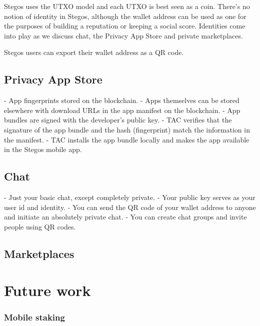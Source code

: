 \documentclass[a4paper, 10pt, conference]{ieeeconf}
\begin{document}
Stegos uses the UTXO model and each UTXO is best seen as a coin. There's no notion of identity in Stegos, although the wallet address can be used as one for the purposes of building a reputation or keeping a social score. Identities come into play as we discuss chat, the Privacy App Store and private marketplaces. 
 
Stegos users can export their wallet address as a QR code. 
 
\subsection{Privacy App Store}
 
- App fingerprints stored on the blockchain. 
- Apps themselves can be stored elsewhere with download URLs in the app manifest on the blockchain.
- App bundles are signed with the developer's public key.
- TAC verifies that the signature of the app bundle and the hash (fingerprint) match the information in the manifest.
- TAC installs the app bundle locally and makes the app available in the Stegos mobile app.

\subsection{Chat}\label{Chat}

- Just your basic chat, except completely private. 
- Your public key serves as your user id and identity. 
- You can send the QR code of your wallet address to anyone and initiate an absolutely private chat.
- You can create chat groups and invite people using QR codes.

\subsection{Marketplaces}

\section{Future work}\label{FutureWork}

\subsubsection{Mobile staking}\label{MobileStaking}
\end{document}
